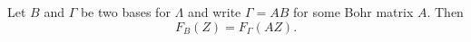 Let $B$ and $\Gamma$ be two bases for $\Lambda$ and write $\Gamma = AB$ for some Bohr matrix $A$. Then
$$F_B(Z) = F_\Gamma(AZ).$$
